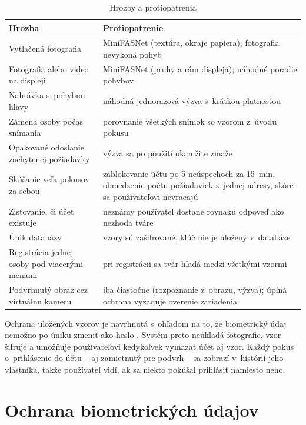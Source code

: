 \documentclass[12pt,a4paper,oneside]{report}
\begin{document}
\begin{table}[H]
  \centering
  \caption{Hrozby a protiopatrenia}
  \label{tab:hrozby}
  \small
  \begin{tabularx}{\textwidth}{@{}>{\raggedright\arraybackslash}p{4.2cm} X@{}}
    \toprule
    Hrozba & Protiopatrenie \\
    \midrule
    Vytlačená fotografia & MiniFASNet (textúra, okraje papiera); fotografia nevykoná pohyb \\
    Fotografia alebo video na displeji & MiniFASNet (pruhy a rám displeja); náhodné poradie pohybov \\
    Nahrávka s~pohybmi hlavy & náhodná jednorazová výzva s~krátkou platnosťou \\
    Zámena osoby počas snímania & porovnanie všetkých snímok so vzorom z~úvodu pokusu \\
    Opakované odoslanie zachytenej požiadavky & výzva sa po použití okamžite zmaže \\
    Skúšanie veľa pokusov za sebou & zablokovanie účtu po 5 neúspechoch za 15~min, obmedzenie počtu požiadaviek z~jednej adresy, skóre sa používateľovi nevracajú \\
    Zisťovanie, či účet existuje & neznámy používateľ dostane rovnakú odpoveď ako nezhoda tváre \\
    Únik databázy & vzory sú zašifrované, kľúč nie je uložený v~databáze \\
    Registrácia jednej osoby pod viacerými menami & pri registrácii sa tvár hľadá medzi všetkými vzormi \\
    Podvrhnutý obraz cez virtuálnu kameru & iba čiastočne (rozpoznanie z~obrazu, výzva); úplná ochrana vyžaduje overenie zariadenia \\
    \bottomrule
  \end{tabularx}
\end{table}

Ochrana uložených vzorov je navrhnutá s~ohľadom na to, že biometrický údaj nemožno
po úniku zmeniť ako heslo \cite{abdullahi2024template}. Systém preto neukladá
fotografie, vzor šifruje a umožňuje používateľovi kedykoľvek vymazať účet aj vzor.
Každý pokus o~prihlásenie do účtu -- aj zamietnutý pre podvrh -- sa zobrazí v~histórii
jeho vlastníka, takže používateľ vidí, ak sa niekto pokúšal prihlásiť namiesto neho.

\section{Ochrana biometrických údajov}
\end{document}
